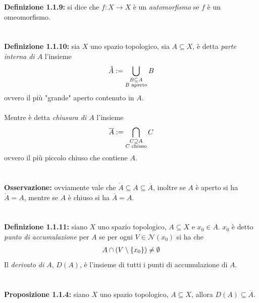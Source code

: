 \documentclass{article}
\begin{document}
\textbf{Definizione 1.1.9:} si dice che $f : X \longrightarrow X$ è un \textit{automorfismo} se $f$ è un omeomorfismo. \\ \\ \\
\textbf{Definizione 1.1.10:} sia $X$ uno spazio topologico, sia $A \subseteq X$, è detta \textit{parte interna di $A$} l'insieme
\begin{gather}
    \mathring{A} := \bigcup_{\substack{B \subseteq A \\ B \text{ aperto}}} B \notag
\end{gather}
ovvero il più "grande" aperto contenuto in $A$. \\ \\
Mentre è detta \textit{chiusura di $A$} l'insieme
\begin{gather}
    \overline{A} := \bigcap_{\substack{C \supseteq A \\ C \text{ chiuso}}} C \notag
\end{gather}
ovvero il più piccolo chiuso che contiene $A$. \\ \\ \\
\textbf{Osservazione:} ovviamente vale che $\mathring{A} \subseteq A \subseteq \overline{A}$, inoltre se $A$ è aperto si ha $\mathring{A} = A$, mentre se $A$ è chiuso si ha $\overline{A} = A$. \\ \\ \\
\textbf{Definizione 1.1.11:} siano $X$ uno spazio topologico, $A \subseteq X$ e $x_0 \in A$. $x_0$ è detto \textit{punto di accumulazione} per $A$ se per ogni $V \in \mathcal{N}(x_0)$ si ha che
\begin{gather}
    A \cap (V \setminus \{ x_0 \}) \neq \emptyset \notag
\end{gather}
Il \textit{derivato di $A$}, $D(A)$, è l'insieme di tutti i punti di accumulazione di $A$. \\ \\ \\
\textbf{Proposizione 1.1.4:} siano $X$ uno spazio topologico, $A \subseteq X$, allora $D(A) \subseteq \overline{A}$. \\
\end{document}
